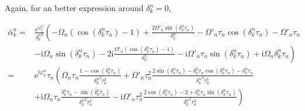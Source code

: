 \documentclass[10pt,fleqn]{article}
\newcommand{\ue}{\mathrm{e}}
\newcommand{\ui}{\mathrm{i}}
\newcommand{\eqar}[1]
{
  \begin{align*}
    #1
  \end{align*}
}
\newcommand{\paren}[1]{{\left({#1}\right)}}
\newcommand{\lparen}[1]{{\left({#1}\right.}}
\newcommand{\rparen}[1]{{\left.{#1}\right)}}
\begin{document}
Again, for an better expression around $\delta_k^n=0$,
\eqar{
  \bar\alpha_k^n=&\frac{\ue^{\ui\varphi_k^n}}{{\delta_k^n}^2}
  \lparen{
    -\Omega_n\paren{\cos\paren{{\delta_k^n}\tau_n}-1}
    +\frac{2\Omega'_n\sin\paren{{\delta_k^n}\tau_n}}{{\delta_k^n}}
    -\Omega'_n\tau_n\cos\paren{{\delta_k^n}\tau_n}
    -\Omega'_n\tau_n
  }\\
  &\rparen{
    -\ui\Omega_n\sin\paren{{\delta_k^n}\tau_n}
    -2\ui\frac{\Omega'_n\paren{\cos\paren{{\delta_k^n}\tau_n}-1}}{{\delta_k^n}}
    -\ui\Omega'_n\tau_n\sin\paren{{\delta_k^n}\tau_n}
    +\ui\Omega_n\delta_k^n\tau_n
  }\\
  =&\ue^{\ui\varphi_k^n}\tau_n
  \lparen{
    \Omega_n\tau_n\frac{1-\cos\paren{{\delta_k^n}\tau_n}}{{\delta_k^n}^2\tau_n^2}
    +\Omega'_n\tau_n^2\frac{2\sin\paren{{\delta_k^n}\tau_n}
      -{\delta_k^n}\tau_n\cos\paren{{\delta_k^n}\tau_n}
      -{\delta_k^n}\tau_n
    }{{\delta_k^n}^3\tau_n^3}
  }\\
  &\rparen{
    +\ui\Omega_n\tau_n\frac{\delta_k^n\tau_n-\sin\paren{{\delta_k^n}\tau_n}}{{\delta_k^n}^2\tau_n^2}
    -\ui\Omega'_n\tau_n^2\frac{2\cos\paren{{\delta_k^n}\tau_n}-2+\delta_k^n\tau_n\sin\paren{{\delta_k^n}\tau_n}}{{\delta_k^n}^3\tau_n^3}
  }
}
\end{document}
